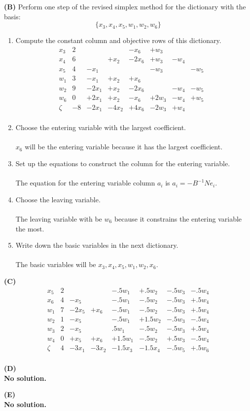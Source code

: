 \documentclass[11pt]{article}
\begin{document}
\noindent\textbf{(B)} Perform one step of the revised simplex method for the dictionary with the basis:
\[ \{x_3, x_4, x_5, w_1, w_2, w_6 \} \]

\begin{enumerate}
\item Compute the constant column and objective rows of this dictionary.
  \[\begin{array}{r|ccccccccccccc}
  x_3 & 2 & & & -x_6 & +w_3 & & & \\
  x_4 & 6 & & +x_2 & -2x_6 & +w_3 & -w_4 & \\
  x_5 & 4 & -x_1 & & & -w_3 & & -w_5 \\
  w_1 & 3 & -x_1 & +x_2 & +x_6 & & & \\
  w_2 & 9 & -2x_1 & +x_2 & -2x_6 & & -w_4 & -w_5 \\
  w_6 & 0 & +2x_1 & +x_2 & -x_6 & +2w_3 & -w_4 & +w_5 \\
  \hline
  \zeta & -8 & -2x_1 & -4x_2 & +4x_6 & -2w_3 & +w_4 & \\
  \end{array}\]
\item Choose the entering variable with the largest coefficient.\\
\\
$x_6$ will be the entering variable because it has the largest coefficient.
\item Set up the equations to construct the column for the entering
  variable.\\
  \\
  The equation for the entering variable column $a_i$ is $a_i = -B^{-1}Ne_i$.

\item Choose the leaving variable.\\
\\
The leaving variable with be $w_6$ because it constrains the entering variable the most.
\item Write down the basic variables in the next dictionary.\\
\\
The basic variables will be $x_3,x_4,x_5,w_1,w_2,x_6$.
\end{enumerate}

\noindent\textbf{(C)}
\\
\[\begin{array}{r|ccccccccccccc}
x_5 & 2 & & & -.5w_1 & +.5w_2 & -.5w_3 & -.5w_4 \\
x_6 & 4 & -x_5 & & -.5w_1 & -.5w_2 & -.5w_3 & +.5w_4 \\
w_1 & 7 & -2x_5 & +x_6 & -.5w_1 & -.5w_2 & -.5w_3 & +.5w_4 \\
w_2 & 1 & -x_5 & & -.5w_1 & +1.5w_2 & -.5w_3 & -.5w_4 \\
w_3 & 2 & -x_5 & & .5w_1 & -.5w_2 & -.5w_3 & +.5w_4 \\
w_4 & 0 & +x_5 & +x_6 & +1.5w_1 & -.5w_2 & +.5w_3 & -.5w_4 \\
\hline
\zeta & 4 & -3x_1 & -3x_2 & -1.5x_3 & -1.5x_4 & -.5w_5 & +.5w_6 \\
\end{array}\]
\bigskip

\noindent\textbf{(D)}
\\
\textbf{No solution.}
\bigskip

\noindent\textbf{(E)} 
\\
\textbf{No solution.}
\bigskip

\end{document}
